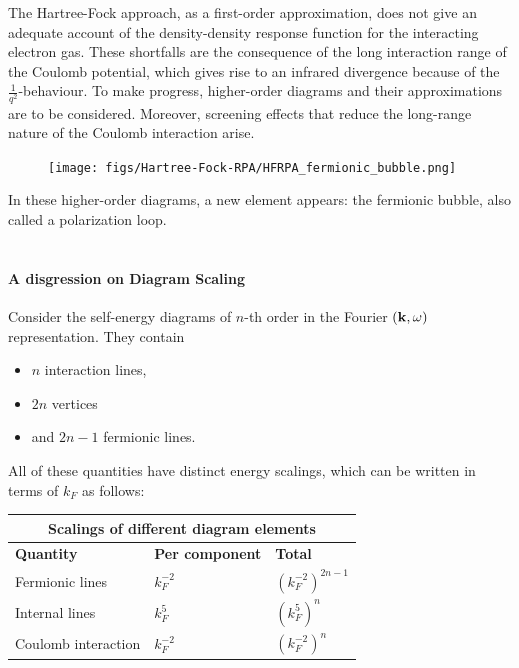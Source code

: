The Hartree-Fock approach, as a first-order approximation, does not give an adequate account of the density-density response function for the interacting electron gas. These shortfalls are the consequence of the long interaction range of the Coulomb potential, which gives rise  to an infrared divergence because of the $\frac{1}{q^2}$-behaviour. To make progress, higher-order diagrams and their approximations are to be considered. Moreover, screening effects that reduce the long-range nature of the Coulomb interaction arise. 

\begin{figure}
\texttt{[image: figs/Hartree-Fock-RPA/HFRPA\_fermionic\_bubble.png]}
\end{figure} 

In these higher-order diagrams, a new element appears: the fermionic bubble, also called a polarization loop.  \\

\blanky \\

\paragraph{A disgression on Diagram Scaling}

Consider the self-energy diagrams of $n$-th order in the Fourier $({\bf k}, \omega)$ representation. They contain

\begin{itemize}
    \item $n$ interaction lines,
    \item $2n$ vertices 
    \item and $2n-1$ fermionic lines. 
\end{itemize}

All of these quantities have distinct energy scalings, which can be written in terms of $k_F$ as follows:

\begin{table}[!h]
\centering
\begin{tabular}{ |p{5cm}||p{5cm}|p{4cm}|  }
 \hline
 \multicolumn{3}{|c|}{Scalings of different diagram elements} \\
 \hline
 \textbf{Quantity} & \textbf{Per component} & \textbf{ Total} \\
 \hline
 Fermionic lines & $k_F^{-2}$ & $(k_F^{-2})^{2n-1}$\\
 Internal lines & $k_F^5$ & $(k_F^5)^n$ \\
 Coulomb interaction & $k_F^{-2}$ & $(k_F^{-2})^n$\\
 \hline
\end{tabular}
 \label{diagram_elements_scalings}
\end{table}

